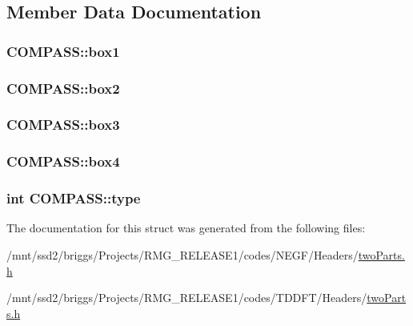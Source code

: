 \subsection{Member Data Documentation}
\hypertarget{struct_c_o_m_p_a_s_s_a46eacc1577f270f8a15d7a4c96a14c3f}{
\subsubsection[{box1}]{ C\-O\-M\-P\-A\-S\-S\-::box1}}\label{struct_c_o_m_p_a_s_s_a46eacc1577f270f8a15d7a4c96a14c3f}
\hypertarget{struct_c_o_m_p_a_s_s_a776d66ae29a5b410460385dd5b777883}{
\subsubsection[{box2}]{ C\-O\-M\-P\-A\-S\-S\-::box2}}\label{struct_c_o_m_p_a_s_s_a776d66ae29a5b410460385dd5b777883}
\hypertarget{struct_c_o_m_p_a_s_s_ac3c28fa36be8eaac8a8f874f0628fe39}{
\subsubsection[{box3}]{ C\-O\-M\-P\-A\-S\-S\-::box3}}\label{struct_c_o_m_p_a_s_s_ac3c28fa36be8eaac8a8f874f0628fe39}
\hypertarget{struct_c_o_m_p_a_s_s_afa0b1be76828772e79a7b75808035476}{
\subsubsection[{box4}]{ C\-O\-M\-P\-A\-S\-S\-::box4}}\label{struct_c_o_m_p_a_s_s_afa0b1be76828772e79a7b75808035476}
\hypertarget{struct_c_o_m_p_a_s_s_aac81c604b47f8c0f113235ea9ae5c9fa}{
\subsubsection[{type}]{\setlength{\rightskip}{0pt plus 5cm}int C\-O\-M\-P\-A\-S\-S\-::type}}\label{struct_c_o_m_p_a_s_s_aac81c604b47f8c0f113235ea9ae5c9fa}


The documentation for this struct was generated from the following files\-:\begin{DoxyCompactItemize}
\item 
/mnt/ssd2/briggs/\-Projects/\-R\-M\-G\-\_\-\-R\-E\-L\-E\-A\-S\-E1/codes/\-N\-E\-G\-F/\-Headers/\hyperlink{_n_e_g_f_2_headers_2two_parts_8h}{two\-Parts.\-h}\item 
/mnt/ssd2/briggs/\-Projects/\-R\-M\-G\-\_\-\-R\-E\-L\-E\-A\-S\-E1/codes/\-T\-D\-D\-F\-T/\-Headers/\hyperlink{_t_d_d_f_t_2_headers_2two_parts_8h}{two\-Parts.\-h}\end{DoxyCompactItemize}
